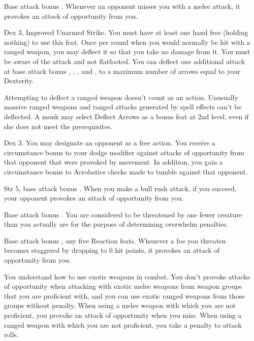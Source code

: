 \featpre Base attack bonus .
\featben Whenever an opponent misses you with a melee attack, it provokes an attack of opportunity from you.

 Dex 3, Improved Unarmed Strike.
 You must have at least one hand free (holding nothing) to use this feat. Once per round when you would normally be hit with a ranged weapon, you may deflect it so that you take no damage from it. You must be aware of the attack and not flatfooted. You can deflect one additional attack at base attack bonus , , , and , to a maximum number of arrows equal to your Dexterity.
\par Attempting to deflect a ranged weapon doesn't count as an action. Unusually massive ranged weapons and ranged attacks generated by spell effects can't be deflected.
 A monk may select Deflect Arrows as a bonus feat at 2nd level, even if she does not meet the prerequisites.

 Dex 3.
 You may designate an opponent as a free action. You receive a  circumstance bonus to your dodge modifier against attacks of opportunity from that opponent that were provoked by movement. In addition, you gain a  circumstance bonus to Acrobatics checks made to tumble against that opponent.

\featpre Str 5, base attack bonus .
\featben When you make a bull rush attack, if you succeed, your opponent provokes an attack of opportunity from you.

 Base attack bonus .
 You are considered to be threatened by one fewer creature than you actually are for the purpose of determining overwhelm penalties.

 Base attack bonus , any five Reaction feats.
 Whenever a foe you threaten becomes staggered by dropping to 0 hit points, it provokes an attack of opportunity from you.

You understand how to use exotic weapons in combat.
 You don't provoke attacks of opportunity when attacking with exotic melee weapons from weapon groups that you are proficient with, and you can use exotic ranged weapons from those groups without penalty.
 When using a melee weapon with which you are not proficient, you provoke an attack of opportunity when you miss. When using a ranged weapon with which you are not proficient, you take a  penalty to attack rolls.

